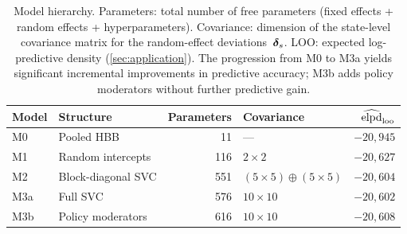 \begin{table}[htbp]
  \centering
  \small
  \begin{tabular}{@{}l l r l r@{}}
    \toprule
    Model & Structure & Parameters
      & Covariance & $\widehat{\operatorname{elpd}}_{\mathrm{loo}}$ \\
    \midrule
    M0  & Pooled HBB
        & 11
        & ---
        & $-20{,}945$ \\
    M1  & Random intercepts
        & 116
        & $2 \times 2$
        & $-20{,}627$ \\
    M2  & Block-diagonal SVC
        & 551
        & $(5 \times 5) \oplus (5 \times 5)$
        & $-20{,}604$ \\
    M3a & Full SVC
        & 576
        & $10 \times 10$
        & $-20{,}602$ \\
    M3b & Policy moderators
        & 616
        & $10 \times 10$
        & $-20{,}608$ \\
    \bottomrule
  \end{tabular}
  \caption{Model hierarchy.  Parameters: total number of free
    parameters (fixed effects + random effects + hyperparameters).
    Covariance: dimension of the state-level covariance matrix for
    the random-effect deviations~$\boldsymbol{\delta}_s$.  LOO: expected
    log-predictive density (\cref{sec:application}).  The
    progression from M0 to M3a yields significant incremental
    improvements in predictive accuracy; M3b adds policy
    moderators without further predictive gain.}
  \label{sme:tab-hierarchy}
\end{table}
